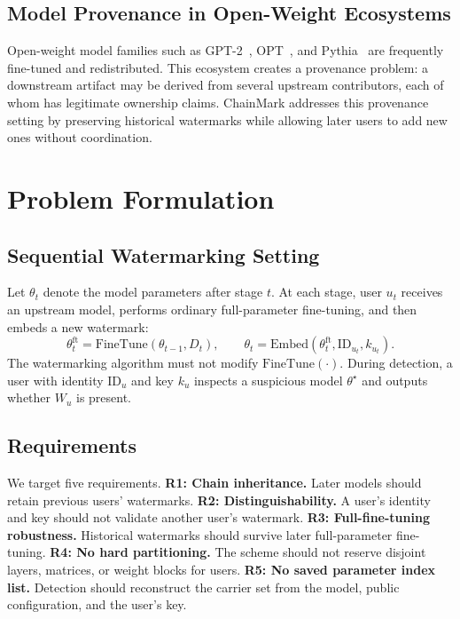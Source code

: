 \documentclass[sigconf]{acmart}
\newcommand{\method}{ChainMark}
\begin{document}
\subsection{Model Provenance in Open-Weight Ecosystems}
Open-weight model families such as GPT-2~\cite{radford2019language}, OPT~\cite{zhang2022opt}, and Pythia~\cite{biderman2023pythia} are frequently fine-tuned and redistributed. This ecosystem creates a provenance problem: a downstream artifact may be derived from several upstream contributors, each of whom has legitimate ownership claims. \method{} addresses this provenance setting by preserving historical watermarks while allowing later users to add new ones without coordination.

\section{Problem Formulation}

\subsection{Sequential Watermarking Setting}
Let $\theta_t$ denote the model parameters after stage $t$. At each stage, user $u_t$ receives an upstream model, performs ordinary full-parameter fine-tuning, and then embeds a new watermark:
\begin{equation}
\theta_t^{\mathrm{ft}} = \mathrm{FineTune}(\theta_{t-1}, D_t), \qquad
\theta_t = \mathrm{Embed}(\theta_t^{\mathrm{ft}}, \mathrm{ID}_{u_t}, k_{u_t}).
\end{equation}
The watermarking algorithm must not modify $\mathrm{FineTune}(\cdot)$. During detection, a user with identity $\mathrm{ID}_{u}$ and key $k_u$ inspects a suspicious model $\theta^\star$ and outputs whether $W_u$ is present.

\subsection{Requirements}
We target five requirements.
\textbf{R1: Chain inheritance.} Later models should retain previous users' watermarks.
\textbf{R2: Distinguishability.} A user's identity and key should not validate another user's watermark.
\textbf{R3: Full-fine-tuning robustness.} Historical watermarks should survive later full-parameter fine-tuning.
\textbf{R4: No hard partitioning.} The scheme should not reserve disjoint layers, matrices, or weight blocks for users.
\textbf{R5: No saved parameter index list.} Detection should reconstruct the carrier set from the model, public configuration, and the user's key.
\end{document}
